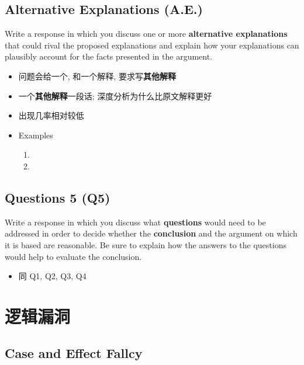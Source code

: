   \subsection{Alternative Explanations (A.E.)}

    Write a response in which you discuss one or more
    \textbf{alternative explanations} that could rival the proposed
    explanations and explain how your explanations can plausibly account for
    the facts presented in the argument.

    \begin{itemize}
      \item 问题会给一个, 和一个解释, 要求写\textbf{其他解释}
      \item 一个\textbf{其他解释}一段话; 深度分析为什么比原文解释更好
      \item 出现几率相对较低
      \item Examples
      \begin{enumerate}
        \item {}
        \item {}
      \end{enumerate}
    \end{itemize}

  \subsection{Questions 5 (Q5)}

    Write a response in which you discuss what \textbf{questions} would need
    to be addressed in order to decide whether the \textbf{conclusion} and the
    argument on which it is based are reasonable. Be sure to explain how the
    answers to the questions would help to evaluate the conclusion.

    \begin{itemize}
      \item 同 Q1, Q2, Q3, Q4
    \end{itemize}

\section{逻辑漏洞}

  \subsection{Case and Effect Fallcy}

